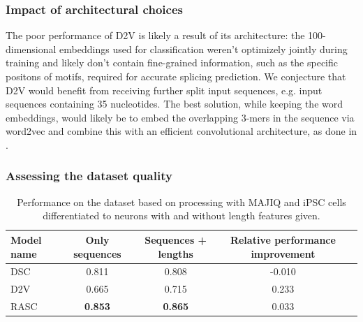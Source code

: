 



\subsubsection{Impact of architectural choices} \label{subsubsec:majiq_architectural_choices}
The poor performance of D2V is likely a result of its architecture: the 100-dimensional embeddings used for classification weren't optimizely jointly during training and likely don't contain fine-grained information, such as the specific positons of motifs, required for accurate splicing prediction. We conjecture that D2V would benefit from receiving further split input sequences, e.g. input sequences containing 35 nucleotides. The best solution, while keeping the word embeddings, would likely be to embed the overlapping 3-mers in the sequence via word2vec and combine this with an efficient convolutional architecture, as done in \cite{d2vsplicing}.



\subsubsection{Assessing the dataset quality}

\begin{table}[h!]
	\centering
	\begin{tabular}{| l | c | c | c| c} 
		\hline
		Model name & Only sequences & Sequences + lengths & Relative performance improvement\\
		\hline
		DSC & 0.811 & 0.808 & -0.010\\
		D2V & 0.665 & 0.715 & 0.233\\
		RASC & \textbf{0.853} & \textbf{0.865} & 0.033\\
		\hline
	\end{tabular}
	\caption{Performance on the dataset based on processing with MAJIQ and iPSC cells differentiated to neurons with and without length features given. 
	}
	\label{table:majiq_nolens}
\end{table}

